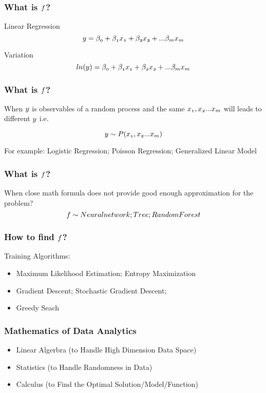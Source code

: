 \documentclass[notheorems, aspectratio=54]{beamer}
\begin{document}
\begin{frame}

\frametitle{What is $\mathnormal{f}$?}

Linear Regression
$$\mathnormal{y=\beta_0+\beta_1 x_1+ \beta_2 x_2 + ... \beta_m x_m}$$

Variation
$$\mathnormal{ln(y)=\beta_0+\beta_1 x_1+ \beta_2 x_2 + ... \beta_m x_m}$$

\end{frame}


\begin{frame}
\frametitle{What is $\mathnormal{f}$?}
When $\mathnormal{y}$ is observables of a random process and the same $\mathnormal{x_1, x_2 ... x_m}$ will leads to different $\mathnormal{y}$ i.e.

$$\mathnormal{y\sim P(x_1, x_2 ... x_m)}$$
\vspace{0.2cm}


For example: 
Logistic Regression;
Poisson Regression;
Generalized Linear Model
\end{frame}

\begin{frame}
\frametitle{What is $\mathnormal{f}$?}
When close math formula does not provide good enough approximation for the problem? \\

$$\mathnormal{f}\sim
Neural network; 
Tree; 
Random Forest
$$ 
\end{frame}


\begin{frame}
\frametitle{How to find $\mathnormal{f}$?}
Training Algorithms:\\
\begin{itemize}
\item Maximum Likelihood Estimation; Entropy Maximization
\item Gradient Descent; Stochastic Gradient Descent;
\item Greedy Seach
\end{itemize}
\end{frame}

\begin{frame}
\frametitle{Mathematics of Data Analytics}
\begin{itemize}
\item Linear Algerbra (to Handle High Dimension Data Space)
\item Statistics (to Handle Randomness in Data)
\item Calculus (to Find the Optimal Solution/Model/Function)
\end{itemize}
\end{frame}
\end{document}
